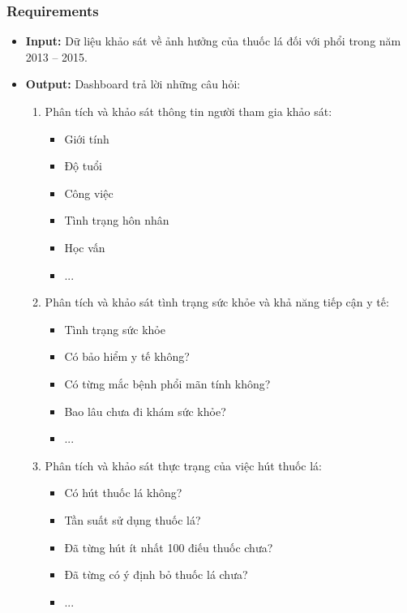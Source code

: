 \subsubsection {Requirements}
\begin{itemize}
    \item \textbf{Input:} Dữ liệu khảo sát về ảnh hưởng của thuốc lá đối với phổi trong năm 2013 – 2015.
\item \textbf{Output: } Dashboard trả lời những câu hỏi:
\begin{enumerate}
    \item Phân tích và khảo sát thông tin người tham gia khảo sát:
    \begin{itemize}[label=$-$]
        \item Giới tính
        \item Độ tuổi
        \item Công việc
        \item Tình trạng hôn nhân
        \item Học vấn
        \item ...
    \end{itemize}
\item Phân tích và khảo sát tình trạng sức khỏe và khả năng tiếp cận y tế: 
    \begin{itemize}[label=$-$]
           \item  Tình trạng sức khỏe
            \item Có bảo hiểm y tế không?
            \item Có từng mắc bệnh phổi mãn tính không?
            \item Bao lâu chưa đi khám sức khỏe?    
            \item ...
        \end{itemize}
\item Phân tích và khảo sát thực trạng của việc hút thuốc lá:
    \begin{itemize}[label=$-$]
        \item Có hút thuốc lá không?
        \item Tần suất sử dụng thuốc lá?
        \item Đã từng hút ít nhất 100 điếu thuốc chưa?
        \item Đã từng có ý định bỏ thuốc lá chưa?
        \item ...
    \end{itemize}

\end{enumerate}
\end{itemize}



